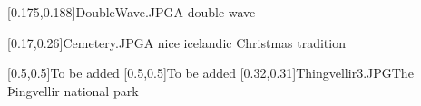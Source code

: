 



\graphicspath{{Figures/}{Figures/Iceland/}}


\subtitle{Day 5}
\date{30.10.2019}


    
    [0.175,0.188]{DoubleWave.JPG}{A double wave}
    
    
    [0.17,0.26]{Cemetery.JPG}{A nice icelandic Christmas tradition}
    
    [0.5,0.5]{}{To be added}
    [0.5,0.5]{}{To be added}
    [0.32,0.31]{Thingvellir3.JPG}{The Þingvellir national park}
    

